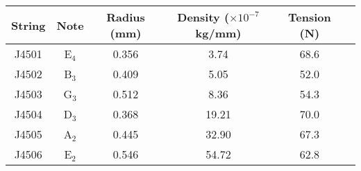 \begin{tabular}{cccccc}
\toprule
String & Note & Radius (mm) & Density ($\times 10^{-7}$ kg/mm) & Tension (N) \\
\midrule
J4501 & E$_{4}$ & 0.356 & 3.74 & 68.6 \\
J4502 & B$_{3}$ & 0.409 & 5.05 & 52.0 \\
J4503 & G$_{3}$ & 0.512 & 8.36 & 54.3 \\
J4504 & D$_{3}$ & 0.368 & 19.21 & 70.0 \\
J4505 & A$_{2}$ & 0.445 & 32.90 & 67.3 \\
J4506 & E$_{2}$ & 0.546 & 54.72 & 62.8 \\
\bottomrule
\end{tabular}

